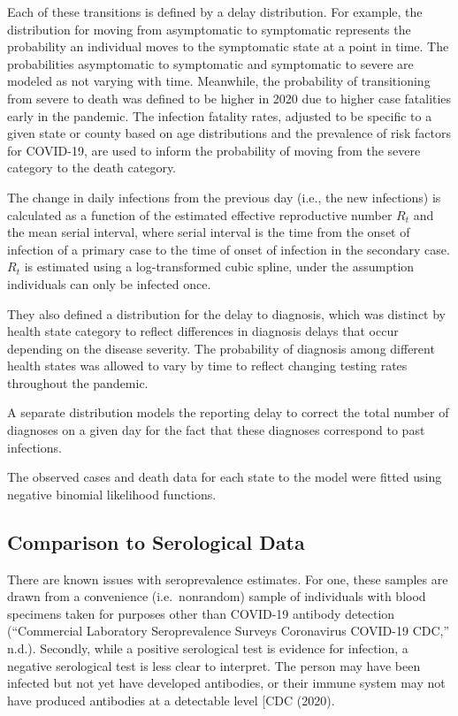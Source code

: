 \documentclass[12pt,twoside]{smiththesis}
\begin{document}
Each of these transitions is defined by a delay distribution. For example, the distribution for moving from asymptomatic to symptomatic represents the probability an individual moves to the symptomatic state at a point in time. The probabilities asymptomatic to symptomatic and symptomatic to severe are modeled as not varying with time. Meanwhile, the probability of transitioning from severe to death was defined to be higher in 2020 due to higher case fatalities early in the pandemic. The infection fatality rates, adjusted to be specific to a given state or county based on age distributions and the prevalence of risk factors for COVID-19, are used to inform the probability of moving from the severe category to the death category.

The change in daily infections from the previous day (i.e., the new infections) is calculated as a function of the estimated effective reproductive number \(R_t\) and the mean serial interval, where serial interval is the time from the onset of infection of a primary case to the time of onset of infection in the secondary case. \(R_t\) is estimated using a log-transformed cubic spline, under the assumption individuals can only be infected once.

They also defined a distribution for the delay to diagnosis, which was distinct by health state category to reflect differences in diagnosis delays that occur depending on the disease severity.
The probability of diagnosis among different health states was allowed to vary by time to reflect changing testing rates throughout the pandemic.

A separate distribution models the reporting delay to correct the total number of diagnoses on a given day for the fact that these diagnoses correspond to past infections.

The observed cases and death data for each state to the model were fitted using negative binomial likelihood functions.

\hypertarget{comparison-to-serological-data}{%
\subsection{Comparison to Serological Data}\label{comparison-to-serological-data}}

There are known issues with seroprevalence estimates. For one, these samples are drawn from a convenience (i.e.~nonrandom) sample of individuals with blood specimens taken for purposes other than COVID-19 antibody detection ({``Commercial {Laboratory Seroprevalence Surveys} \textbar{} {Coronavirus} \textbar{} {COVID-19} \textbar{} {CDC},''} n.d.). Secondly, while a positive serological test is evidence for infection, a negative serological test is less clear to interpret. The person may have been infected but not yet have developed antibodies, or their immune system may not have produced antibodies at a detectable level {[}CDC (2020).
\end{document}
